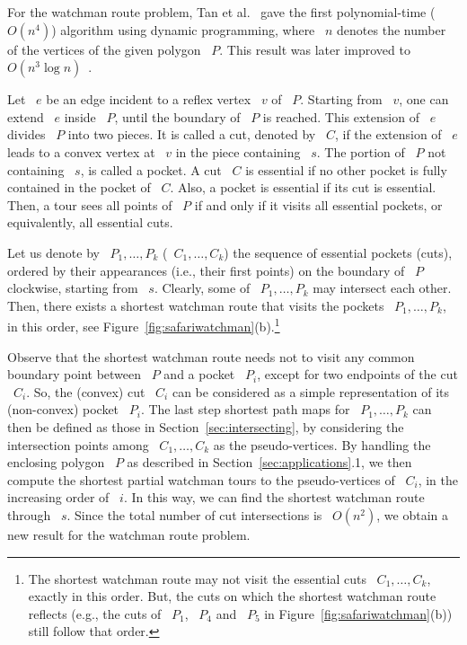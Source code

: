 \documentclass[11pt]{article}
\begin{document}
For the watchman route problem, Tan et al.~\cite{ref13,ref14} gave the first polynomial-time (~\(O(n^4)\)) algorithm using dynamic programming, where ~\(n\) denotes the number of the vertices of the given polygon ~\(P\).
This result was later improved to ~\(O(n^3\log n)\)~\cite{ref6}.

Let ~\(e\) be an edge incident to a reflex vertex ~\(v\) of ~\(P\).
Starting from ~\(v\), one can extend ~\(e\) inside ~\(P\), until the boundary of ~\(P\) is reached.
This extension of ~\(e\) divides ~\(P\) into two pieces.
It is called a cut, denoted by ~\(C\), if the extension of ~\(e\) leads to a convex vertex at ~\(v\) in the piece containing ~\(s\).
The portion of ~\(P\) not containing ~\(s\), is called a pocket.
A cut ~\(C\) is essential if no other pocket is fully contained in the pocket of ~\(C\).
Also, a pocket is essential if its cut is essential.
Then, a tour sees all points of ~\(P\) if and only if it visits all essential pockets, or equivalently, all essential cuts.

Let us denote by ~\(P_1, \ldots, P_k\) (~\(C_1, \ldots, C_k\)) the sequence of essential pockets (cuts), ordered by their appearances (i.e., their first points) on the boundary of ~\(P\) clockwise, starting from ~\(s\).
Clearly, some of ~\(P_1, \ldots, P_k\) may intersect each other.
Then, there exists a shortest watchman route that visits the pockets ~\(P_1, \ldots, P_k\), in this order, see Figure~\ref{fig:safariwatchman}(b).\footnote{The shortest watchman route may not visit the essential cuts ~\(C_1, \ldots, C_k\), exactly in this order. But, the cuts on which the shortest watchman route reflects (e.g., the cuts of ~\(P_1\), ~\(P_4\) and ~\(P_5\) in Figure~\ref{fig:safariwatchman}(b)) still follow that order.}

Observe that the shortest watchman route needs not to visit any common boundary point between ~\(P\) and a pocket ~\(P_i\), except for two endpoints of the cut ~\(C_i\).
So, the (convex) cut ~\(C_i\) can be considered as a simple representation of its (non-convex) pocket ~\(P_i\).
The last step shortest path maps for ~\(P_1, \ldots, P_k\) can then be defined as those in Section~\ref{sec:intersecting}, by considering the intersection points among ~\(C_1, \ldots, C_k\) as the pseudo-vertices.
By handling the enclosing polygon ~\(P\) as described in Section~\ref{sec:applications}.1, we then compute the shortest partial watchman tours to the pseudo-vertices of ~\(C_i\), in the increasing order of ~\(i\).
In this way, we can find the shortest watchman route through ~\(s\).
Since the total number of cut intersections is ~\(O(n^2)\), we obtain a new result for the watchman route problem.
\end{document}
